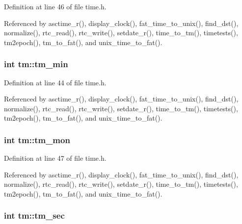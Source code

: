 Definition at line 46 of file time.\+h.



Referenced by asctime\+\_\+r(), display\+\_\+clock(), fat\+\_\+time\+\_\+to\+\_\+unix(), find\+\_\+dst(), normalize(), rtc\+\_\+read(), rtc\+\_\+write(), setdate\+\_\+r(), time\+\_\+to\+\_\+tm(), timetests(), tm2epoch(), tm\+\_\+to\+\_\+fat(), and unix\+\_\+time\+\_\+to\+\_\+fat().

\subsubsection[{\texorpdfstring{tm\+\_\+min}{tm_min}}]{\setlength{\rightskip}{0pt plus 5cm}int tm\+::tm\+\_\+min}\hypertarget{structtm_af414eb7c86cc3099595211eee4d4211b}{}\label{structtm_af414eb7c86cc3099595211eee4d4211b}


Definition at line 44 of file time.\+h.



Referenced by asctime\+\_\+r(), display\+\_\+clock(), fat\+\_\+time\+\_\+to\+\_\+unix(), find\+\_\+dst(), normalize(), rtc\+\_\+read(), rtc\+\_\+write(), setdate\+\_\+r(), time\+\_\+to\+\_\+tm(), timetests(), tm2epoch(), tm\+\_\+to\+\_\+fat(), and unix\+\_\+time\+\_\+to\+\_\+fat().

\subsubsection[{\texorpdfstring{tm\+\_\+mon}{tm_mon}}]{\setlength{\rightskip}{0pt plus 5cm}int tm\+::tm\+\_\+mon}\hypertarget{structtm_a112ac36fa2f593777138a417cf031e17}{}\label{structtm_a112ac36fa2f593777138a417cf031e17}


Definition at line 47 of file time.\+h.



Referenced by asctime\+\_\+r(), display\+\_\+clock(), fat\+\_\+time\+\_\+to\+\_\+unix(), find\+\_\+dst(), normalize(), rtc\+\_\+read(), rtc\+\_\+write(), setdate\+\_\+r(), time\+\_\+to\+\_\+tm(), timetests(), tm2epoch(), tm\+\_\+to\+\_\+fat(), and unix\+\_\+time\+\_\+to\+\_\+fat().

\subsubsection[{\texorpdfstring{tm\+\_\+sec}{tm_sec}}]{\setlength{\rightskip}{0pt plus 5cm}int tm\+::tm\+\_\+sec}\hypertarget{structtm_a4d098a9a5c03a00b2ee61e10851de81e}{}\label{structtm_a4d098a9a5c03a00b2ee61e10851de81e}


